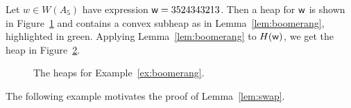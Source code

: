 \begin{example}\label{ex:boomerang} Let $w \in W(A_5)$ have expression $\mathsf{w} = 3524343213$. Then a heap for $\mathsf{w}$ is shown in Figure~\ref{fig:boomerangex1} and contains a convex subheap as in Lemma~\ref{lem:boomerang}, highlighted in \textcolor{ggreen}{green}. Applying Lemma~\ref{lem:boomerang} to $H(\mathsf{w})$, we get the heap in Figure~\ref{fig:boomerangex2}.
\begin{center} \begin{figure}[H] \centering
\begin{subfigure}{0.4\textwidth} \centering
{}
\caption{}\label{fig:boomerangex1}
\end{subfigure}
\begin{subfigure}{0.4\textwidth} \centering
{}
\caption{}\label{fig:boomerangex2}
\end{subfigure}
\caption{The heaps for Example~\ref{ex:boomerang}.}\label{}
\end{figure} \end{center}
\end{example}

    The following example motivates the proof of Lemma~\ref{lem:swap}.

